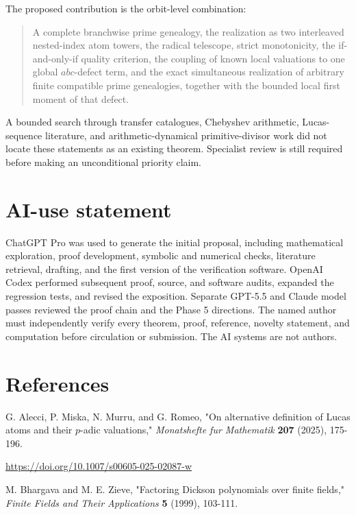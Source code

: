 \documentclass[11pt]{article}
\begin{document}
The proposed contribution is the orbit-level combination:

\begin{quote}\small
A complete branchwise prime genealogy, the realization as two
interleaved nested-index atom towers, the radical telescope, strict
monotonicity, the if-and-only-if quality criterion, the coupling of
known local valuations to one global \(abc\)-defect term, and the exact
simultaneous realization of arbitrary finite compatible prime
genealogies, together with the bounded local first moment of that defect.
\end{quote}

A bounded search through transfer catalogues, Chebyshev arithmetic,
Lucas-sequence literature, and arithmetic-dynamical primitive-divisor work
did not locate these statements as an existing theorem. Specialist review
is still required before making an unconditional priority claim.

\section{AI-use statement}

ChatGPT Pro was used to generate the initial proposal, including
mathematical exploration, proof development, symbolic and numerical checks,
literature retrieval, drafting, and the first version of the verification
software. OpenAI Codex performed subsequent proof, source, and software
audits, expanded the regression tests, and revised the exposition. Separate
GPT-5.5 and Claude model passes reviewed the proof chain and the Phase 5
directions. The named author must independently verify every theorem, proof,
reference, novelty statement, and computation before circulation or
submission. The AI systems are not authors.

\section{References}

G. Alecci, P. Miska, N. Murru, and G. Romeo, "On alternative definition
of Lucas atoms and their \(p\)-adic valuations," \emph{Monatshefte fur
Mathematik} \textbf{207} (2025), 175-196.

\url{https://doi.org/10.1007/s00605-025-02087-w}

M. Bhargava and M. E. Zieve, "Factoring Dickson polynomials over finite
fields," \emph{Finite Fields and Their Applications} \textbf{5} (1999), 103-111.
\end{document}

